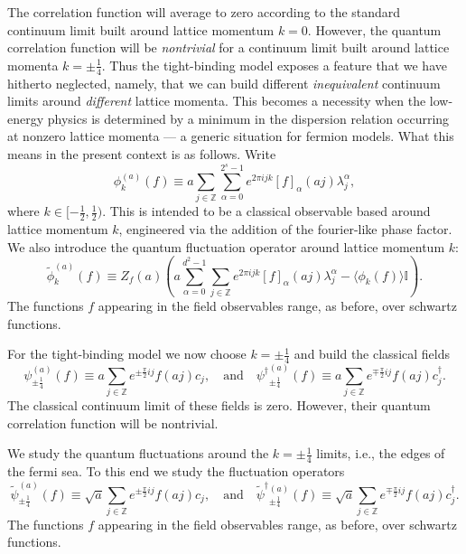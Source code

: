 \documentclass[prl,twocolumn,lengthcheck,superscriptaddress]{revtex4-1}
\theoremstyle{definition}
\theoremstyle{remark}
\begin{document}
The correlation function will average to zero according to the standard continuum limit built around lattice momentum $k=0$. However, the quantum correlation function will be \emph{nontrivial} for a continuum limit built around lattice momenta $k=\pm\frac14$. Thus the tight-binding model exposes a feature that we have hitherto neglected, namely, that we can build different \emph{inequivalent} continuum limits around \emph{different} lattice momenta. This becomes a necessity when the low-energy physics is determined by a minimum in the dispersion relation occurring at nonzero lattice momenta --- a generic situation for fermion models. What this means in the present context is as follows. Write
\begin{equation}
	\phi^{(a)}_k(f) \equiv a\sum_{j\in\mathbb{Z}} \sum_{\alpha=0}^{2^s-1} e^{2\pi i jk}[f]_\alpha(aj) \lambda_j^\alpha,
\end{equation}
where $k \in [-\frac12, \frac12)$. This is intended to be a classical observable based around lattice momentum $k$, engineered via the addition of the fourier-like phase factor. We also introduce the quantum fluctuation operator around lattice momentum $k$:
\begin{equation}
	\widetilde{\phi}^{(a)}_k(f) \equiv Z_f(a)\left( a\sum_{\alpha=0}^{d^2-1}\sum_{j\in \mathbb{Z}} e^{2\pi i jk}[f]_\alpha(aj) \lambda^\alpha_j - \langle\phi_k(f)\rangle\mathbb{I}\right).
\end{equation}
The functions $f$ appearing in the field observables range, as before, over schwartz functions.

For the tight-binding model we now choose $k = \pm\frac14$ and build the classical fields 
\begin{equation}
	\psi^{(a)}_{\pm\frac{1}{4}}(f) \equiv a\sum_{j\in\mathbb{Z}} e^{\pm\frac{\pi}{2} i j}f(aj) c_j, \quad \text{and} \quad {\psi^\dag}^{(a)}_{\pm\frac{1}{4}}(f) \equiv a\sum_{j\in\mathbb{Z}} e^{\mp \frac{\pi}{2} i j}f(aj) c_j^\dag.
\end{equation}
The classical continuum limit of these fields is zero. However, their quantum correlation function will be nontrivial.

We study the quantum fluctuations around the $k=\pm \frac14$ limits, i.e., the edges of the fermi sea. To this end we study the fluctuation operators
\begin{equation}
	\widetilde{\psi}^{(a)}_{\pm\frac14}(f) \equiv \sqrt{a}\sum_{j\in \mathbb{Z}} e^{\pm\frac{\pi}{2} i j}f(aj) c_j, \quad \text{and} \quad {\widetilde{\psi}^\dag}{}^{(a)}_{\pm\frac{1}{4}}(f) \equiv \sqrt{a}\sum_{j\in\mathbb{Z}} e^{\mp \frac{\pi}{2} i j}f(aj) c_j^\dag.
\end{equation}
The functions $f$ appearing in the field observables range, as before, over schwartz functions.
\end{document}
